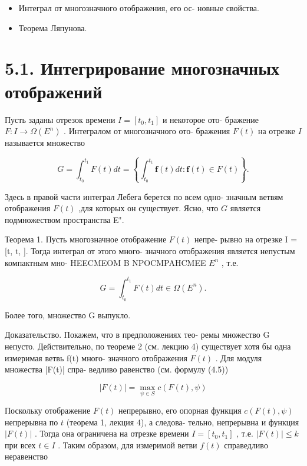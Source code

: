 \documentclass[8pt]{extarticle}
\begin{document}
\begin{itemize}\relax
\item\relax Интеграл от многозначного отображения, его ос- новные свойства.
\end{itemize}

\begin{itemize}\relax
\item\relax Теорема Ляпунова.
\end{itemize}

\section*{5.1. Интегрирование многозначных отображений}

Пусть заданы отрезок времени \(I = \left\lbrack  {{t}_{0},{t}_{1}}\right\rbrack\) и некоторое ото- бражение \(F : I \rightarrow  \Omega \left( {E}^{n}\right)\) . Интегралом от многозначного ото- бражения \(F\left( t\right)\) на отрезке \(I\) называется множество

\[
G = {\int }_{{t}_{0}}^{{t}_{1}}F\left( t\right) {dt} = \left\{  {{\int }_{{t}_{0}}^{{t}_{1}}\mathbf{f}\left( t\right) {dt} : \mathbf{f}\left( t\right)  \in  F\left( t\right) }\right\}  .
\]

Здесь в правой части интеграл Лебега берется по всем одно- значным ветвям отображения \(F\left( t\right)\) ,для которых он существует. Ясно, что \(G\) является подмножеством пространства E".

Теорема 1. Пусть многозначное отображение \(F\left( t\right)\) непре- рывно на отрезке I = [t, t, ]. Тогда интеграл от этого много- значного отображения является непустым компактным мно- HEECMEOM B NPOCMPAHCMEE \({E}^{n}\) , т.е.

\[
G = {\int }_{{t}_{0}}^{{t}_{1}}F\left( t\right) {dt} \in  \Omega \left( {E}^{n}\right) .
\]

Более того, множество G выпукло.

Доказательство. Покажем, что в предположениях тео- ремы множество G непусто. Действительно, по теореме 2 (см. лекцию 4) существует хотя бы одна измеримая ветвь f(t) много- значного отображения \(F\left( t\right)\) . Для модуля множества |F(t)| спра- ведливо равенство (см. формулу (4.5))

\[
\left| {F\left( t\right) }\right|  = \mathop{\max }\limits_{{\psi  \in  S}}c\left( {F\left( t\right) ,\psi }\right)
\]

Поскольку отображение \(F\left( t\right)\) непрерывно, его опорная функция \(c\left( {F\left( t\right) ,\psi }\right)\) непрерывна по \(t\) (теорема 1, лекция 4), а следова- тельно, непрерывна и функция \(\left| {F\left( t\right) }\right|\) . Тогда она ограничена на отрезке времени \(I = \left\lbrack  {{t}_{0},{t}_{1}}\right\rbrack\) , т.е. \(\left| {F\left( t\right) }\right|  \leq  k\) при всех \(t \in  I\) . Таким образом, для измеримой ветви \(f\left( t\right)\) справедливо неравенство
\end{document}
